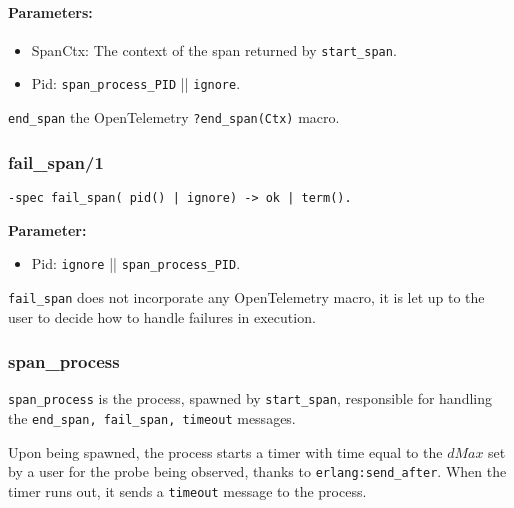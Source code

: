             \paragraph{Parameters:}
            \begin{itemize}
                \item SpanCtx: The context of the span returned by \texttt{start\_span}.
                \item Pid: \texttt{span\_process\_PID} || \texttt{ignore}.
            \end{itemize}

   \texttt{end\_span} the OpenTelemetry \texttt{?end\_span(Ctx)} macro. 
        \subsubsection{fail\_span/1}
        \begin{verbatim}        
-spec fail_span( pid() | ignore) -> ok | term().
        \end{verbatim}

        \textbf{Parameter:}
             \begin{itemize}
                \item Pid: \texttt{ignore} || \texttt{span\_process\_PID}.
            \end{itemize}
            \texttt{fail\_span} does not incorporate any OpenTelemetry macro, it is let up to the user to decide how to handle failures in execution.
        \subsubsection{span\_process}
            \texttt{span\_process} is the process, spawned by \texttt{start\_span}, responsible for handling the \texttt{end\_span, fail\_span, timeout} messages.

            Upon being spawned, the process starts a timer with time equal to the $dMax$ set by a user for the probe being observed, thanks to \texttt{erlang:send\_after}. When the timer runs out, it sends a \texttt{timeout} message to the process.
        
